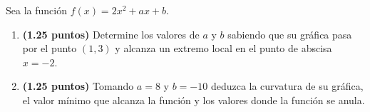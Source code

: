 
Sea la función $f(x)=2x^2+ax+b$.
\begin{enumerate}[label=\alph*)]
\item \textbf{(1.25 puntos)} Determine los valores de $a$ y $b$ sabiendo que su gráfica pasa por el punto $(1,3)$ y alcanza un extremo local en el punto de abscisa $x=-2$.
\item \textbf{(1.25 puntos)} Tomando $a=8$ y $b=-10$ deduzca la curvatura de su gráfica, el valor mínimo que alcanza la función y los valores donde la función se anula.
\end{enumerate}
